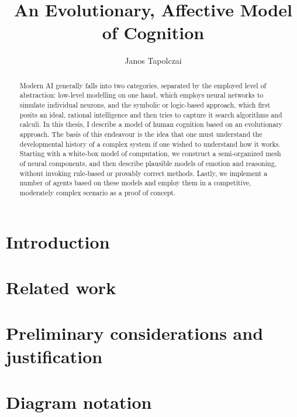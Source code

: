 \documentclass[]{scrartcl}
\title{{\huge An Evolutionary, Affective Model of Cognition}}
\author{Janos Tapolczai}
\begin{document}
\maketitle


\begin{abstract}
Modern AI generally falls into two categories, separated by the employed level of abstraction: low-level modelling on one hand, which employs neural networks to simulate individual neurons, and the symbolic or logic-based approach, which first posits an ideal, rational intelligence and then tries to capture it search algorithms and calculi. In this thesis, I describe a model of human cognition based on an evolutionary approach. The basis of this endeavour is the idea that one must understand the developmental history of a complex system if one wished to understand how it works. Starting with a white-box model of computation, we construct a semi-organized mesh of neural components, and then describe plausible models of emotion and reasoning, without invoking rule-based or provably correct methods. Lastly, we implement a number of agents based on these models and employ them in a competitive, moderately complex scenario as a proof of concept.
\end{abstract}

\newpage

\hypersetup{linkcolor=black}
\tableofcontents
\hypersetup{linkcolor=DeepBlue}
\newpage

\begingroup
\let\clearpage\relax

\section{Introduction}



\section{Related work}

\section{Preliminary considerations and justification}\label{sec:preliminaries}



\section{Diagram notation}
\end{document}
